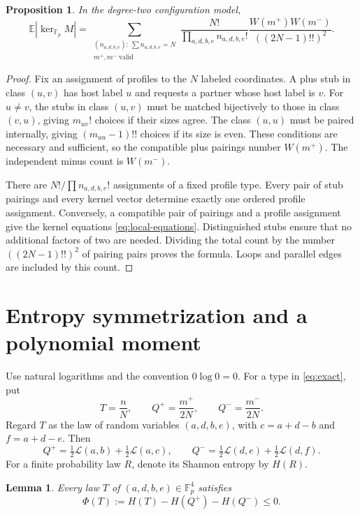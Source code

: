 \documentclass[11pt]{article}
\newtheorem{proposition}[theorem]{Proposition}
\newtheorem{lemma}[theorem]{Lemma}
\theoremstyle{remark}
\newcommand{\F}{\mathbb F}
\newcommand{\E}{\mathbb E}
\newcommand{\1}{\mathbf 1}
\newcommand{\Law}{\mathcal L}
\begin{document}
\begin{proposition}\label{prop:exact}
In the degree-two configuration model,
\begin{equation}\label{eq:exact}
 \E|\ker_{\F_p}M|
 =\sum_{\substack{(n_{a,d,b,e}):\ \sum n_{a,d,b,e}=N\\
                         m^+,m^-\ \mathrm{valid}}}
   \frac{N!}{\prod_{a,d,b,e}n_{a,d,b,e}!}
   \frac{W(m^+)W(m^-)}{((2N-1)!!)^2}.
\end{equation}
\end{proposition}

\begin{proof}
Fix an assignment of profiles to the $N$ labeled coordinates. A plus
stub in class $(u,v)$ has host label $u$ and requests a partner whose
host label is $v$. For $u\ne v$, the stubs in class $(u,v)$ must be
matched bijectively to those in class $(v,u)$, giving $m_{uv}!$
choices if their sizes agree. The class $(u,u)$ must be paired
internally, giving $(m_{uu}-1)!!$ choices if its size is even. These
conditions are necessary and sufficient, so the compatible plus
pairings number $W(m^+)$. The independent minus count is $W(m^-)$.

There are $N!/\prod n_{a,d,b,e}!$ assignments of a fixed profile type.
Every pair of stub pairings and every kernel vector determine exactly
one ordered profile assignment. Conversely, a compatible pair of
pairings and a profile assignment give the kernel equations
\eqref{eq:local-equations}. Distinguished stubs ensure that no
additional factors of two are needed. Dividing the total count by
the number $((2N-1)!!)^2$ of pairing pairs proves the formula.
Loops and parallel edges are included by this count.
\end{proof}

\section{Entropy symmetrization and a polynomial moment}

Use natural logarithms and the convention $0\log0=0$. For a type in
\eqref{eq:exact}, put
\[
 T=\frac nN,\qquad Q^+=\frac{m^+}{2N},\qquad
 Q^-=\frac{m^-}{2N}.
\]
Regard $T$ as the law of random variables $(a,d,b,e)$, with
$c=a+d-b$ and $f=a+d-e$. Then
\[
 Q^+=\tfrac12\Law(a,b)+\tfrac12\Law(a,c),\qquad
 Q^-=\tfrac12\Law(d,e)+\tfrac12\Law(d,f).
\]
For a finite probability law $R$, denote its Shannon entropy by $H(R)$.

\begin{lemma}\label{lem:entropy}
Every law $T$ of $(a,d,b,e)\in\F_p^4$ satisfies
\begin{equation}\label{eq:entropy}
 \Phi(T):=H(T)-H(Q^+)-H(Q^-)\leq0.
\end{equation}
\end{lemma}
\end{document}
